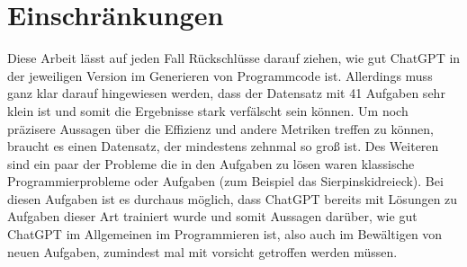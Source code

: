 \documentclass[class=scrbook, crop=false]{standalone}
\begin{document}
\chapter{Einschränkungen}
\label{ch:einschraenkungen}
    Diese Arbeit lässt auf jeden Fall Rückschlüsse darauf ziehen, wie gut ChatGPT in der jeweiligen Version im Generieren
    von Programmcode ist.
    Allerdings muss ganz klar darauf hingewiesen werden, dass der Datensatz mit 41 Aufgaben sehr klein ist und somit die Ergebnisse stark verfälscht sein können.
    Um noch präzisere Aussagen über die Effizienz und andere Metriken treffen zu können, braucht es einen Datensatz, der mindestens
    zehnmal so groß ist.
    Des Weiteren sind ein paar der Probleme die in den Aufgaben zu lösen waren klassische Programmierprobleme oder Aufgaben (zum Beispiel das Sierpinskidreieck).
    Bei diesen Aufgaben ist es durchaus möglich, dass ChatGPT bereits mit Lösungen zu Aufgaben dieser Art trainiert wurde
    und somit Aussagen darüber, wie gut ChatGPT im Allgemeinen im Programmieren ist, also auch im Bewältigen von neuen Aufgaben,
    zumindest mal mit vorsicht getroffen werden müssen.
\end{document}
